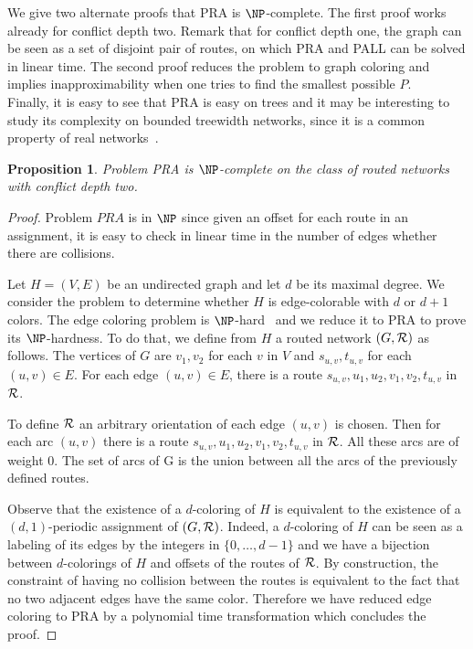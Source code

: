 \documentclass[a4paper,10pt]{article}
\newtheorem{proposition}{Proposition}
\begin{document}
We give two alternate proofs that PRA is $\NP$-complete.
The first proof works already for conflict depth two. Remark that for conflict depth one,
the graph can be seen as a set of disjoint pair of routes, on which PRA and PALL can be solved in linear time. 
 The second proof reduces the problem to graph coloring and implies inapproximability when one tries to find the smallest possible $P$. \\
 Finally, it is easy to see that PRA is easy on trees and it may be interesting to study its complexity on 
 bounded treewidth networks, since it is a common property of real networks~\cite{de2011treewidth}.
 

 \begin{proposition}
Problem PRA is $\NP$-complete on the class of routed networks with conflict depth two.
\end{proposition}
 \begin{proof}
 Problem $PRA$ is in $\NP$ since given an offset for each route in an assignment, it is easy to check in linear time in the number of edges whether there are collisions.
 
  Let $H=(V,E)$ be an undirected graph and let $d$ be its maximal degree. We consider the problem to determine whether $H$ is edge-colorable
  with $d$ or $d+1$ colors. The edge coloring problem is $\NP$-hard~\cite{holyer1981np} and we reduce it to PRA to prove its $\NP$-hardness. To do that, we define from $H$ a routed network $(G,{\cal R})$ as follows.
  The vertices of $G$ are $v_1, v_2$ for each $v$ in $V$ and $s_{u,v}, t_{u,v}$ for each $(u,v) \in E$.
  For each edge $(u,v) \in E$, there is a route $s_{u,v},u_1,u_2,v_1,v_2,t_{u,v}$ in ${\cal R}$. 
  
   To define ${\cal R}$ an arbitrary orientation of each edge $(u,v)$ is chosen. 
   Then for each arc $(u,v)$ there is a route $s_{u,v},u_1,u_2,v_1,v_2,t_{u,v}$ in ${\cal R}$.
  All these arcs are of weight $0$. The set of arcs of G is the union between all the arcs of the previously defined routes.
   
    
  Observe that the existence of a $d$-coloring of $H$ is equivalent to the existence of a $(d,1)$-periodic assignment
  of $(G,{\cal R})$. Indeed, a $d$-coloring of $H$ can be seen as a labeling of its edges by the integers
  in $\{0,\dots,d-1\}$ and we have a bijection between $d$-colorings of $H$ and offsets of the routes of ${\cal R}$.
  By construction, the constraint of having no collision between the routes is equivalent to the fact that no two adjacent edges have the same color. Therefore we have reduced edge coloring to PRA by a polynomial time transformation which concludes the proof. 
 \end{proof}
 
\end{document}
